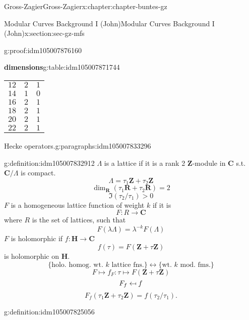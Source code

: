 \documentclass[oneside,10pt,]{book}
\numberwithin{equation}{section}
\providecommand\mapsfrom{\mathrel{\reflectbox{\ensuremath{\mapsto}}}}
\newcommand{\ZZ}{\mathbf{Z}}
\newcommand{\RR}{\mathbf{R}}
\newcommand{\CC}{\mathbf{C}}
\newcommand{\HH}{\mathbf{H}}
\newcommand{\gt}{>}
\begin{document}
\begin{chapterptx}{Gross-Zagier}{}{Gross-Zagier}{}{}{x:chapter:chapter-buntes-gz}
\begin{sectionptx}{Modular Curves Background I (John)}{}{Modular Curves Background I (John)}{}{}{x:section:sec-gz-mfs}
\begin{proofptx}{}{g:proof:idm105007876160}
\begin{tableptx}{\textbf{dimensions}}{g:table:idm105007871744}{}
{\begin{tabular}{lll}
\(12\)&\(2\)&\(1\)\tabularnewline[0pt]
\(14\)&\(1\)&\(0\)\tabularnewline[0pt]
\(16\)&\(2\)&\(1\)\tabularnewline[0pt]
\(18\)&\(2\)&\(1\)\tabularnewline[0pt]
\(20\)&\(2\)&\(1\)\tabularnewline[0pt]
\(22\)&\(2\)&\(1\)
\end{tabular}
}%
\end{tableptx}%
\end{proofptx}
\begin{paragraphs}{Hecke operators.}{g:paragraphs:idm105007833296}%
\begin{definition}{}{g:definition:idm105007832912}%
\(\Lambda \) is a lattice if it is a rank 2 \(\ZZ\)-module in \(\CC\) s.t. \(\CC/\Lambda \) is compact.%
\begin{equation*}
\Lambda = \tau _1\ZZ + \tau _2 \ZZ
\end{equation*}
%
\begin{equation*}
\dim_\RR(\tau _1 \RR + \tau _2\RR) = 2
\end{equation*}
%
\begin{equation*}
\Im (\tau _2 / \tau _1 ) \gt 0
\end{equation*}
\(F\) is a homogeneous lattice function of weight \(k\) if it is%
\begin{equation*}
F\colon R \to \CC
\end{equation*}
where \(R\) is the set of lattices, such that%
\begin{equation*}
F(\lambda \Lambda ) = \lambda ^{-k}F(\Lambda )
\end{equation*}
\(F\) is holomorphic if \(f\colon  \HH \to \CC\)%
\begin{equation*}
f(\tau ) = F(\ZZ + \tau \ZZ)
\end{equation*}
is holomorphic on \(\HH\).%
\begin{equation*}
\{\text{holo. homog. wt. }k\text{ lattice fns.}\}\leftrightarrow \{\text{wt. }k\text{ mod. fms.}\}
\end{equation*}
%
\begin{equation*}
F\mapsto f_F\colon \tau  \mapsto F(\ZZ+ \tau \ZZ)
\end{equation*}
%
\begin{equation*}
F_f \mapsfrom f
\end{equation*}
%
\begin{equation*}
F_f (\tau _1 \ZZ+ \tau _2 \ZZ) = f(\tau _2/\tau _1)\text{.}
\end{equation*}
%
\end{definition}
\begin{definition}{}{g:definition:idm105007825056}%

\end{definition}
\end{paragraphs}
\end{sectionptx}
\end{chapterptx}
\end{document}
